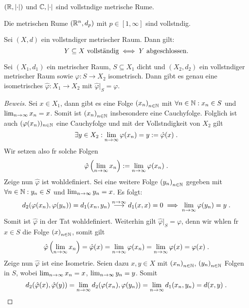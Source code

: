 \begin{ex}
	\((\mathbb{R}, \left\lvert \cdot \right\rvert)\) und \(\mathbb{C}, \left\lvert \cdot \right\rvert\) sind vollst\as ndige metrische R\as ume. 
\end{ex}

\begin{ex}
	Die metrischen R\as ume  \((\mathbb{R}^n, d_p)\) mit \(p \in [1, \infty]\) sind vollst\as ndig.
\end{ex}

\begin{theorem}
	Sei \((X, d)\) ein vollst\as ndiger metrischer Raum. Dann gilt: 
	\[ Y \subseteq X \text{ vollst{\"a}ndig} \iff Y \text{ abgeschlossen.}\]
\end{theorem}

\begin{theorem}
	Sei \((X_1,d_1)\) ein metrischer Raum, \(S\subseteq X_1\) dicht und \((X_2, d_2)\) ein vollst\as ndiger metrischer Raum sowie \(\varphi: S \to X_2\) isometrisch. Dann gibt es genau eine isometrisches \(\hat\varphi: X_1\to X_2\) mit \(\hat\varphi\vert_S = \varphi\).
	\label{vollst_isometrie}
\end{theorem}
\begin{proof}[Beweis]
	Sei \(x\in X_1\), dann gibt es eine Folge \(\left (x_n\right )_{n\in \mathbb{N}}\) mit \(\forall n \in \mathbb{N}: x_n \in S\) und \(\lim_{n \to \infty} x_n = x\). Somit ist \(\left (x_n\right )_{n\in \mathbb{N}}\) insbesondere eine Cauchyfolge. Folglich ist auch \((\varphi(x_n))_{n\in\mathbb{N}}\) eine Cauchyfolge und mit der Vollst\as ndigkeit von $X_2$ gilt
	\[\exists y\in X_2: \lim_{n \to\infty} \varphi(x_n) = y:= \hat\varphi(x)\;.\]
	Wir setzen also f\us r solche Folgen \[\hat\varphi\left(\lim_{n \to \infty} x_n\right) := \lim_{n \to\infty} \varphi(x_n)\;.\]
	Zeige nun \(\hat \varphi\) ist wohldefiniert. Sei eine weitere Folge \(\left (y_n\right )_{n\in \mathbb{N}}\) gegeben mit \(\forall n \in \mathbb{N}: y_n \in S\) und \(\lim_{n \to \infty} y_n = x\). Es folgt:
	\[d_2(\varphi(x_n), \varphi(y_n)) = d_1(x_n, y_n) \overset{n\to\infty}{\longrightarrow} d_1(x,x) = 0 \implies \lim_{n \to\infty} \varphi(y_n) = y\;.\]
	Somit ist $\hat\varphi$ in der Tat wohldefiniert. Weiterhin gilt \(\hat\varphi\vert_S = \varphi\), denn wir w\as hlen f\us r \(x \in S\) die Folge $\left (x\right )_{n\in \mathbb{N}}$, somit gilt
	\[ \hat \varphi\left(\lim_{n \to \infty} x_n \right) = \hat\varphi(x) = \lim_{n \to\infty} \varphi(x_n) = \lim_{n \to\infty} \varphi(x) = \varphi(x)\;.\] 
	Zeige nun \(\hat\varphi\) ist eine Isometrie. Seien dazu \(x,y\in X\) mit  $\left (x_n\right )_{n\in \mathbb{N}}$, $\left (y_n\right )_{n\in \mathbb{N}}$ Folgen in $S$, wobei $\lim_{n \to \infty} x_n = x$, $\lim_{n \to \infty} y_n = y$. Somit
	\[d_2(\hat\varphi(x), \hat\varphi(y)) = \lim_{n \to\infty} d_2(\varphi(x_n), \varphi(y_n)) = \lim_{n \to\infty} d_1(x_n, y_n) = d(x,y) \;.\] 
\end{proof}

